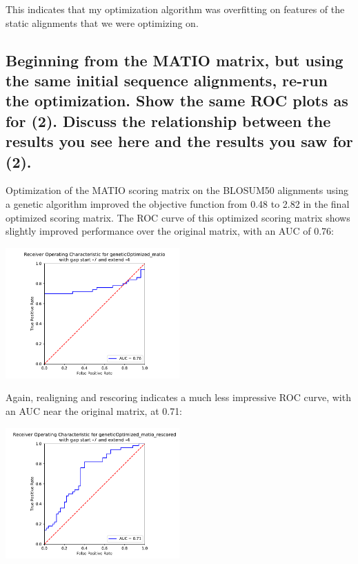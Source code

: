 \documentclass[]{article}
\begin{document}
This indicates that my optimization algorithm was overfitting on features of the static alignments that we were optimizing on.

\subsection{Beginning from the MATIO matrix, but using the same initial sequence alignments, re-run the optimization. Show the same ROC plots as for (2). Discuss the relationship between the results you see here and the results you saw for (2).}

Optimization of the MATIO scoring matrix on the BLOSUM50 alignments using a genetic algorithm improved the objective function from 0.48 to 2.82 in the final optimized scoring matrix. The ROC curve of this optimized scoring matrix shows slightly improved performance over the original matrix, with an AUC of 0.76:

\vspace{1em}
\includegraphics[width=0.5\textwidth]{../BMI203_HW3_alignment/plots/ROC_geneticOptimized_matio.pdf}
\vspace{1em}

Again, realigning and rescoring indicates a much less impressive ROC curve, with an AUC near the original matrix, at 0.71:


\vspace{1em}
\includegraphics[width=0.5\textwidth]{../BMI203_HW3_alignment/plots/ROC_geneticOptimized_matio_rescored.pdf}
\vspace{1em}
\end{document}
